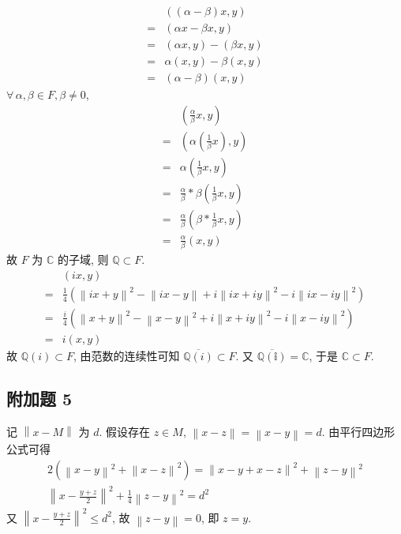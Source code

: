 \documentclass[\ROOT/main.tex]{subfiles}
\begin{document}
\begin{align*}
     & \left( \left( \alpha - \beta \right) x , y \right) \\
    =& \left( \alpha x - \beta x , y \right) \\
    =& \left( \alpha x, y \right) - \left( \beta x, y \right) \\
    =& \alpha \left( x, y \right) - \beta \left( x, y \right) \\
    =& \left( \alpha - \beta \right) \left( x, y \right)
\end{align*}
$\forall \, \alpha, \beta \in F, \beta \neq 0$,
\begin{align*}
     & \left( \frac{\alpha}{\beta} x, y \right) \\
    =& \left( \alpha \left( \frac{1}{\beta} x \right) , y \right) \\
    =& \alpha \left( \frac{1}{\beta} x , y \right) \\
    =& \frac{\alpha}{\beta} * \beta \left( \frac{1}{\beta} x, y \right) \\
    =& \frac{\alpha}{\beta} \left( \beta * \frac{1}{\beta} x, y \right) \\
    =& \frac{\alpha}{\beta} \left( x, y \right)
\end{align*}
故 $F$ 为 $\mathbb{C}$ 的子域, 则 $\mathbb{Q} \subset F$.
\begin{align*}
     & \left( i x, y \right) \\
    =& \frac{1}{4} \left( \left\| i x + y \right\|^2 - \left\| ix - y \right\| + i \left\| i x + i y \right\|^2 - i \left\| i x - i y \right\|^2 \right) \\
    =& \frac{i}{4} \left( \left\| x + y \right\|^2 - \left\| x - y \right\|^2 + i \left\| x + i y \right\|^2 - i \left\| x - i y \right\|^2 \right) \\
    =& i \left( x, y \right)
\end{align*}
故 $\mathbb{Q} \left( i \right) \subset F$, 由范数的连续性可知 $\overline{\mathbb{Q} \left( i \right)} \subset F$.
又 $\overline{\mathbb{Q \left( i \right)}} = \mathbb{C}$, 于是 $\mathbb{C} \subset F$.

\subsection{附加题 5}
记 $\left\| x - M \right\|$ 为 $d$.
假设存在 $z \in M$, $\left\| x - z \right\| = \left\| x - y \right\| = d$.
由平行四边形公式可得
\begin{gather*}
    2 \left( \left\| x - y \right\|^2 + \left\| x - z \right\|^2 \right)
    =
    \left\| x - y + x - z \right\|^2 + \left\| z - y \right\|^2 \\
    \left\| x - \frac{y + z}{2} \right\|^2 + \frac{1}{4} \left\| z - y \right\|^2
    =
    d^2
\end{gather*}
又 $\left\| x - \displaystyle \frac{y + z}{2} \right\|^2 \leqslant d^2$, 故 $\left\| z - y \right\| = 0$, 即 $z = y$.
\end{document}
